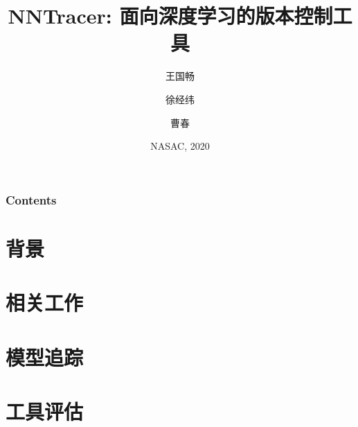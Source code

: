\documentclass{beamer}
\title[NNTracer] %
{NNTracer: 面向深度学习的版本控制工具}
\author[Wang, Xu, Cao] %
{王国畅 \and 徐经纬 \and 曹春}
\institute[NJU] %
{
  软件新技术国家重点实验室\\
  南京大学
}
\date[NASAC 2020] %
{NASAC, 2020}
\begin{document}
\frame{\titlepage}


\begin{frame}
\frametitle{Contents}
\tableofcontents
\end{frame}


\section{背景}


\section{相关工作}

\section{模型追踪}

\section{工具评估}

\end{document}
